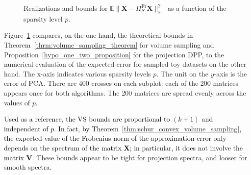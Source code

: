 \documentclass[twoside,11pt]{book}
\newcommand{\rev}[1]{\textcolor{black}{#1}}
\numberwithin{theorem}{chapter}
\numberwithin{definition}{chapter}
\numberwithin{proposition}{chapter}
\numberwithin{corollary}{chapter}
\numberwithin{example}{chapter}
\numberwithin{lemma}{chapter}
\numberwithin{assumption}{chapter}
\numberwithin{equation}{chapter}
\numberwithin{figure}{chapter}
\DeclareMathOperator{\Fr}{\mathrm{Fr}}
\begin{document}
\begin{figure}
 \setcounter{subfigure}{2}%
 \setcounter{subfigure}{5}%

\caption{Realizations and bounds for $\mathbb{E} \|\bm{X}- \Pi_{S}^{\Fr} \bm{X}\|_{\Fr}^{2}$ as a function of the sparsity level $p$. \label{fig:toydatasets_vs_dpp_comparison_0}}
\end{figure}


Figure~\ref{fig:toydatasets_vs_dpp_comparison_0} compares, on the one hand, the theoretical bounds in Theorem~\ref{thrm:volume_sampling_theorem} for volume sampling and Proposition~\ref{hypo_one_two_proposition} for the projection DPP, to the numerical evaluation of the expected error for sampled toy datasets on the other hand. The x-axis indicates various sparsity levels $p$. The unit on the $y$-axis is the error of PCA. There are 400 crosses on each subplot: each of the 200 matrices appears once for both algorithms. The 200 matrices are spread evenly across the values of $p$.

\rev{Used as a reference, the VS bounds are proportional to $(k+1)$ and independent of $p$. In fact, by Theorem~\ref{thm:schur_convex_volume_sampling}, the expected value of the Frobenius norm of the approximation error only depends on the spectrum of the matrix $\bm{X}$; in particular, it does not involve the matrix $\bm{V}$.} These bounds appear to be tight for projection spectra, and looser for smooth spectra.
\end{document}
